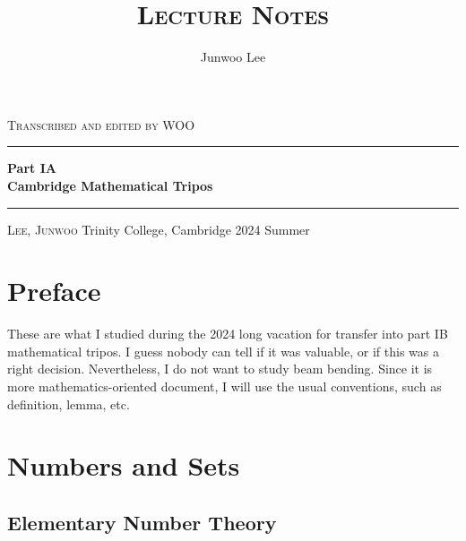 \documentclass[10pt, a4paper, twoside]{report}
\title{\LARGE{\textsc{Lecture Notes}}}
\author{Junwoo Lee}
\date{}
\begin{document}
\begin{titlepage}
  \begingroup %
  \def\drop{0.1\textheight}
  \vspace*{\drop}
  \begin{center}
  {\LARGE\textsc{Transcribed and edited by WOO}}\\[\drop]
  \rule{\textwidth}{1pt}\par
  \vspace{0.5\baselineskip}
  {\huge\bfseries Part IA\\
   \large Cambridge Mathematical Tripos}\\[0.5\baselineskip]
  \rule{\textwidth}{1pt}\par
  \vfill
  {\Large\textsc{Lee, Junwoo}}
  \vfill
  Trinity College, Cambridge
  \vfill
  {\large 2024 Summer}
  \end{center}
  \endgroup
\end{titlepage}
\tableofcontents
\chapter*{Preface}
These are what I studied during the 2024 long vacation for transfer into part IB mathematical tripos. I guess nobody can tell if it was valuable, or if this was a right decision. Nevertheless, I do not want to study beam bending. Since it is more mathematics-oriented document, I will use the usual conventions, such as definition, lemma, etc.

\noindent\hrulefill\hspace{0.2cm} \floweroneleft\floweroneright \hspace{0.2cm} \hrulefill
\chapter{Numbers and Sets}
\section{Elementary Number Theory}
\end{document}

